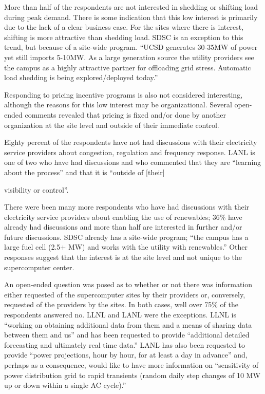 More than half of the respondents are not interested in shedding or shifting
load during peak demand. There is some indication that this low interest is
primarily due to the lack of a clear business case. For the sites where
there is interest, shifting is more attractive than shedding load. SDSC is
an exception to this trend, but because of a site-wide program. ``UCSD
generates 30-35MW of power yet still imports 5-10MW. As a large generation
source the utility providers see the campus as a highly attractive partner
for offloading grid stress. Automatic load shedding is being
explored/deployed today.''

Responding to pricing incentive programs is also not considered interesting,
although the reasons for this low interest may be organizational. Several
open-ended comments revealed that pricing is fixed and/or done by another
organization at the site level and outside of their immediate control.

Eighty percent of the respondents have not had discussions with their
electricity service providers about congestion, regulation and frequency
response. LANL is one of two who have had discussions and who commented that
they are ``learning about the process'' and that it is ``outside of [their]

visibility or control''.

There were been many more respondents who have had discussions with their
electricity service providers about enabling the use of renewables; 36{\%}
have already had discussions and more than half are interested in further
and/or future discussions. SDSC already has a site-wide program; ``the
campus has a large fuel cell (2.5$+$ MW) and works with the utility with
renewables.'' Other responses suggest that the interest is at the site level
and not unique to the supercomputer center.

An open-ended question was posed as to whether or not there was information
either requested of the supercomputer sites by their providers or,
conversely, requested of the providers by the sites. In both cases, well
over 75{\%} of the respondents answered no. LLNL and LANL were the
exceptions. LLNL is ``working on obtaining additional data from them and a
means of sharing data between them and us'' and has been requested to
provide ``additional detailed forecasting and ultimately real time data.''
LANL has also been requested to provide ``power projections, hour by hour,
for at least a day in advance'' and, perhaps as a consequence, would like to
have more information on ``sensitivity of power distribution grid to rapid
transients (random daily step changes of 10 MW up or down within a single AC
cycle).''

